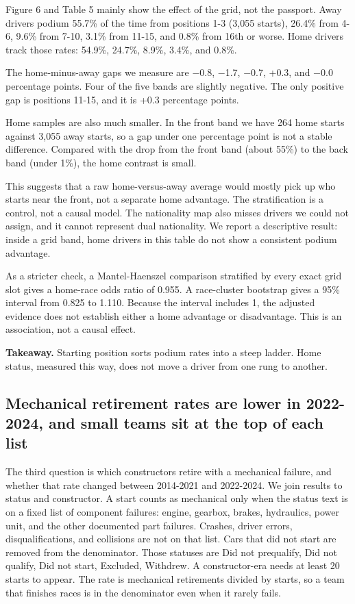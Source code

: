 \documentclass[10pt,a4paper]{article}
\begin{document}
Figure 6 and Table 5 mainly show the effect of the grid, not the passport. Away drivers podium 55.7\% of the time from positions 1-3 (3,055 starts), 26.4\% from 4-6, 9.6\% from 7-10, 3.1\% from 11-15, and 0.8\% from 16th or worse. Home drivers track those rates: 54.9\%, 24.7\%, 8.9\%, 3.4\%, and 0.8\%.


The home-minus-away gaps we measure are $-$0.8, $-$1.7, $-$0.7, +0.3, and $-$0.0 percentage points. Four of the five bands are slightly negative. The only positive gap is positions 11-15, and it is +0.3 percentage points.


Home samples are also much smaller. In the front band we have 264 home starts against 3,055 away starts, so a gap under one percentage point is not a stable difference. Compared with the drop from the front band (about 55\%) to the back band (under 1\%), the home contrast is small.


This suggests that a raw home-versus-away average would mostly pick up who starts near the front, not a separate home advantage. The stratification is a control, not a causal model. The nationality map also misses drivers we could not assign, and it cannot represent dual nationality. We report a descriptive result: inside a grid band, home drivers in this table do not show a consistent podium advantage.


As a stricter check, a Mantel-Haenszel comparison stratified by every exact grid slot gives a home-race odds ratio of 0.955. A race-cluster bootstrap gives a 95\% interval from 0.825 to 1.110. Because the interval includes 1, the adjusted evidence does not establish either a home advantage or disadvantage. This is an association, not a causal effect.


\begin{takeaway}
\textbf{Takeaway.} Starting position sorts podium rates into a steep ladder. Home status, measured this way, does not move a driver from one rung to another.
\end{takeaway}



\subsection{Mechanical retirement rates are lower in 2022-2024, and small teams sit at the top of each list}


The third question is which constructors retire with a mechanical failure, and whether that rate changed between 2014-2021 and 2022-2024. We join results to status and constructor. A start counts as mechanical only when the status text is on a fixed list of component failures: engine, gearbox, brakes, hydraulics, power unit, and the other documented part failures. Crashes, driver errors, disqualifications, and collisions are not on that list. Cars that did not start are removed from the denominator. Those statuses are Did not prequalify, Did not qualify, Did not start, Excluded, Withdrew. A constructor-era needs at least 20 starts to appear. The rate is mechanical retirements divided by starts, so a team that finishes races is in the denominator even when it rarely fails.
\end{document}
